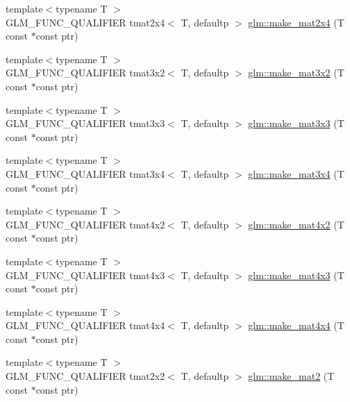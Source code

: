 \begin{DoxyCompactItemize}
\item 
{\footnotesize template$<$typename T $>$ }\\G\+L\+M\+\_\+\+F\+U\+N\+C\+\_\+\+Q\+U\+A\+L\+I\+F\+I\+E\+R tmat2x4$<$ T, defaultp $>$ \hyperlink{group__gtc__type__ptr_ga6dfb2ac10859b0cc8e3893ea84fa95b5}{glm\+::make\+\_\+mat2x4} (T const $\ast$const ptr)
\item 
{\footnotesize template$<$typename T $>$ }\\G\+L\+M\+\_\+\+F\+U\+N\+C\+\_\+\+Q\+U\+A\+L\+I\+F\+I\+E\+R tmat3x2$<$ T, defaultp $>$ \hyperlink{group__gtc__type__ptr_gabe1e5066608a66da7a94f802b57b4eed}{glm\+::make\+\_\+mat3x2} (T const $\ast$const ptr)
\item 
{\footnotesize template$<$typename T $>$ }\\G\+L\+M\+\_\+\+F\+U\+N\+C\+\_\+\+Q\+U\+A\+L\+I\+F\+I\+E\+R tmat3x3$<$ T, defaultp $>$ \hyperlink{group__gtc__type__ptr_ga3cbe7adf857c867cee77eae4617abadd}{glm\+::make\+\_\+mat3x3} (T const $\ast$const ptr)
\item 
{\footnotesize template$<$typename T $>$ }\\G\+L\+M\+\_\+\+F\+U\+N\+C\+\_\+\+Q\+U\+A\+L\+I\+F\+I\+E\+R tmat3x4$<$ T, defaultp $>$ \hyperlink{group__gtc__type__ptr_gac083edd180ab4d4b817acc60c516209b}{glm\+::make\+\_\+mat3x4} (T const $\ast$const ptr)
\item 
{\footnotesize template$<$typename T $>$ }\\G\+L\+M\+\_\+\+F\+U\+N\+C\+\_\+\+Q\+U\+A\+L\+I\+F\+I\+E\+R tmat4x2$<$ T, defaultp $>$ \hyperlink{group__gtc__type__ptr_ga967a5b934e67ff9a6d1d0d27a377a264}{glm\+::make\+\_\+mat4x2} (T const $\ast$const ptr)
\item 
{\footnotesize template$<$typename T $>$ }\\G\+L\+M\+\_\+\+F\+U\+N\+C\+\_\+\+Q\+U\+A\+L\+I\+F\+I\+E\+R tmat4x3$<$ T, defaultp $>$ \hyperlink{group__gtc__type__ptr_ga4d42daced532b33cc672280e48670a51}{glm\+::make\+\_\+mat4x3} (T const $\ast$const ptr)
\item 
{\footnotesize template$<$typename T $>$ }\\G\+L\+M\+\_\+\+F\+U\+N\+C\+\_\+\+Q\+U\+A\+L\+I\+F\+I\+E\+R tmat4x4$<$ T, defaultp $>$ \hyperlink{group__gtc__type__ptr_gaf605a5f5e2ff594e8d404b2855b09541}{glm\+::make\+\_\+mat4x4} (T const $\ast$const ptr)
\item 
{\footnotesize template$<$typename T $>$ }\\G\+L\+M\+\_\+\+F\+U\+N\+C\+\_\+\+Q\+U\+A\+L\+I\+F\+I\+E\+R tmat2x2$<$ T, defaultp $>$ \hyperlink{group__gtc__type__ptr_ga52a16e333fef7e33ca740779482a8693}{glm\+::make\+\_\+mat2} (T const $\ast$const ptr)

\end{DoxyCompactItemize}
